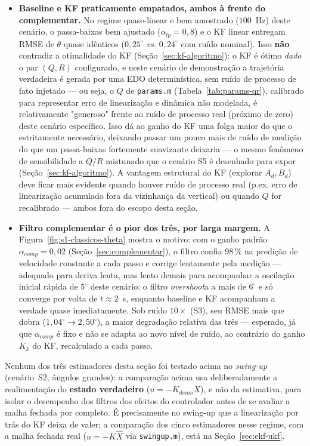 \documentclass[brazil, 12pt]{article}
\begin{document}
\begin{itemize}
  \item \textbf{Baseline e KF praticamente empatados, ambos à frente do
  complementar.} No regime quase-linear e bem amostrado ($100$~Hz) deste
  cenário, o passa-baixas bem ajustado ($\alpha_{lp}=0{,}8$) e o KF linear
  entregam RMSE de $\theta$ quase idênticos ($0{,}25^{\circ}$ \emph{vs.}
  $0{,}24^{\circ}$ com ruído nominal). Isso \textbf{não} contradiz a
  otimalidade do KF (Seção~\ref{sec:kf-algoritmo}): o KF é ótimo
  \emph{dado} o par $(Q,R)$ configurado, e neste cenário de demonstração a
  trajetória verdadeira é gerada por uma EDO determinística, sem ruído de
  processo de fato injetado — ou seja, o $Q$ de \texttt{params.m}
  (Tabela~\ref{tab:params-qr}), calibrado para representar erro de
  linearização e dinâmica não modelada, é relativamente "generoso" frente ao
  ruído de processo real (próximo de zero) deste cenário específico. Isso dá
  ao ganho do KF uma folga maior do que o estritamente necessário, deixando
  passar um pouco mais de ruído de medição do que um passa-baixas
  fortemente suavizante deixaria — o mesmo fenômeno de sensibilidade a
  $Q/R$ mistunado que o cenário S5 é desenhado para expor
  (Seção~\ref{sec:kf-algoritmo}). A vantagem estrutural do KF (explorar
  $A_d,B_d$) deve ficar mais evidente quando houver ruído de processo real
  (p.ex. erro de linearização acumulado fora da vizinhança da vertical) ou
  quando $Q$ for recalibrado — ambos fora do escopo desta seção.

  \item \textbf{Filtro complementar é o pior dos três, por larga margem.} A
  Figura~\ref{fig:s1-classicos-theta} mostra o motivo: com o ganho padrão
  $\alpha_{comp}=0{,}02$ (Seção~\ref{sec:complementar}), o filtro confia
  $98\,\%$ na predição de velocidade constante a cada passo e corrige
  lentamente pela medição — adequado para deriva lenta, mas lento demais
  para acompanhar a oscilação inicial rápida de $5^{\circ}$ deste cenário: o
  filtro \emph{overshoot}a a mais de $6^{\circ}$ e só converge por volta de
  $t\approx2$~s, enquanto baseline e KF acompanham a verdade quase
  imediatamente. Sob ruído $10\times$ (S3), seu RMSE mais que dobra
  ($1{,}04^{\circ}\to2{,}50^{\circ}$), a maior degradação relativa das três
  — esperado, já que $\alpha_{comp}$ é fixo e não se adapta ao novo nível de
  ruído, ao contrário do ganho $K_k$ do KF, recalculado a cada passo.
\end{itemize}

Nenhum dos três estimadores desta seção foi testado acima no \emph{swing-up}
(cenário~S2, ângulos grandes): a comparação acima usa deliberadamente a
realimentação do \textbf{estado verdadeiro} ($u=-K_{demo}X$), e não da
estimativa, para isolar o desempenho dos filtros dos efeitos do controlador
antes de se avaliar a malha fechada por completo. É precisamente no swing-up
que a linearização por trás do KF deixa de valer; a comparação dos cinco
estimadores nesse regime, com a malha fechada real ($u=-K\hat X$ via
\texttt{swingup.m}), está na Seção~\ref{sec:ekf-ukf}.
\end{document}
